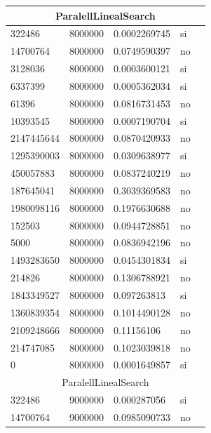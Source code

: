 \documentclass[12pt, fleqn]{article}                             %
\theoremstyle{break}                                            %
\begin{document}
\begin{longtable}{|m{5em}|m{5em}|m{10em}|m{5em}|@{}m{0pt}@{}}
            \multicolumn{5}{|c|}{ParalellLinealSearch}   \\          \hline
            322486& 8000000  & 0.0002269745 & si &\\[1em]    \hline
            14700764& 8000000  & 0.0749590397 & no &\\[1em]    \hline
            3128036& 8000000  & 0.0003600121 & si &\\[1em]    \hline
            6337399& 8000000  & 0.0005362034 & si &\\[1em]    \hline
            61396& 8000000  & 0.0816731453 & no &\\[1em]    \hline
            10393545& 8000000  & 0.0007190704 & si &\\[1em]    \hline
            2147445644& 8000000  & 0.0870420933 & no &\\[1em]    \hline
            1295390003& 8000000  & 0.0309638977 & si &\\[1em]    \hline
            450057883& 8000000  & 0.0837240219 & no &\\[1em]    \hline
            187645041& 8000000  & 0.3039369583 & no &\\[1em]    \hline
            1980098116& 8000000  & 0.1976630688 & no &\\[1em]    \hline
            152503& 8000000  & 0.0944728851 & no &\\[1em]    \hline
            5000& 8000000  & 0.0836942196 & no &\\[1em]    \hline
            1493283650& 8000000  & 0.0454301834 & si &\\[1em]    \hline
            214826& 8000000  & 0.1306788921 & no &\\[1em]    \hline
            1843349527& 8000000  & 0.097263813 & si &\\[1em]    \hline
            1360839354& 8000000  & 0.1014490128 & no &\\[1em]    \hline
            2109248666& 8000000  & 0.11156106 & no &\\[1em]    \hline
            214747085& 8000000  & 0.1023039818 & no &\\[1em]    \hline
            0& 8000000  & 0.0001649857 & si &\\[1em]    \hline
            \multicolumn{5}{|c|}{ParalellLinealSearch}   \\          \hline
            322486& 9000000  & 0.000287056 & si &\\[1em]    \hline
            14700764& 9000000  & 0.0985090733 & no &\\[1em]    \hline

\end{longtable}
\end{document}
